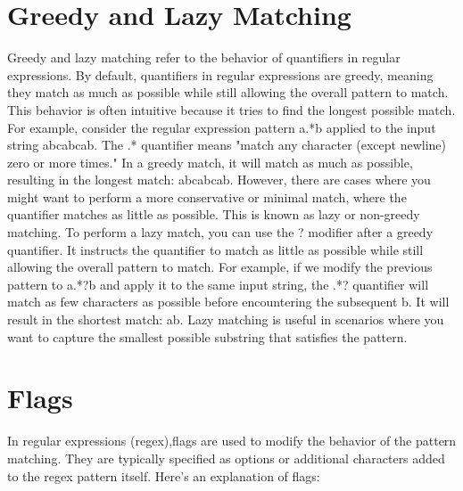 \documentclass{report}
\begin{document}
    \section{Greedy and Lazy Matching}
    Greedy and lazy matching refer to the behavior of quantifiers in regular expressions.
    \bigbreak \noindent 
    By default, quantifiers in regular expressions are greedy, meaning they match as much as possible while still allowing the overall pattern to match. This behavior is often intuitive because it tries to find the longest possible match.
    \bigbreak \noindent 
    For example, consider the regular expression pattern a.*b applied to the input string abcabcab. The .* quantifier means "match any character (except newline) zero or more times." In a greedy match, it will match as much as possible, resulting in the longest match: abcabcab.
    \bigbreak \noindent 
    However, there are cases where you might want to perform a more conservative or minimal match, where the quantifier matches as little as possible. This is known as lazy or non-greedy matching.
    \bigbreak \noindent 
    To perform a lazy match, you can use the ? modifier after a greedy quantifier. It instructs the quantifier to match as little as possible while still allowing the overall pattern to match.
    \bigbreak \noindent 
    For example, if we modify the previous pattern to a.*?b and apply it to the same input string, the .*? quantifier will match as few characters as possible before encountering the subsequent b. It will result in the shortest match: ab.
    \bigbreak \noindent 
    Lazy matching is useful in scenarios where you want to capture the smallest possible substring that satisfies the pattern.
    \bigbreak \noindent 

    \pagebreak
    \bigbreak
    \noindent

    \section{Flags}
    \bigbreak \noindent 
    In regular expressions (regex),flags are used to modify the behavior of the pattern matching. They are typically specified as options or additional characters added to the regex pattern itself. Here's an explanation of flags:
\end{document}
